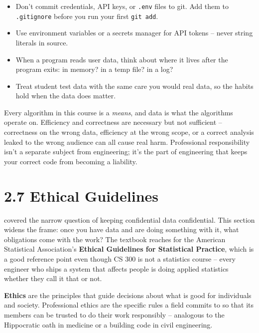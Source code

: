 \documentclass[11pt]{article}
\begin{document}
\begin{itemize}[leftmargin=*,noitemsep]
    \item Don't commit credentials, API keys, or \texttt{.env} files
          to git. Add them to \texttt{.gitignore} before you run your
          first \texttt{git add}.
    \item Use environment variables or a secrets manager for
          API tokens -- never string literals in source.
    \item When a program reads user data, think about where it lives
          after the program exits: in memory? in a temp file? in a
          log?
    \item Treat student test data with the same care you would real
          data, so the habits hold when the data does matter.
\end{itemize}

\begin{ideabox}
Every algorithm in this course is a \emph{means}, and data is what
the algorithms operate on. Efficiency and correctness are necessary
but not sufficient -- correctness on the wrong data, efficiency at
the wrong scope, or a correct analysis leaked to the wrong audience
can all cause real harm. Professional responsibility isn't a separate
subject from engineering; it's the part of engineering that keeps
your correct code from becoming a liability.
\end{ideabox}

\section{2.7 Ethical Guidelines}

 covered the narrow question of keeping confidential
data confidential. This section widens the frame: once you have data
and are doing something with it, what obligations come with the work?
The textbook reaches for the American Statistical Association's
\textbf{Ethical Guidelines for Statistical Practice}, which is a good
reference point even though CS 300 is not a statistics course --
every engineer who ships a system that affects people is doing applied
statistics whether they call it that or not.

\begin{defnbox}
\textbf{Ethics} are the principles that guide decisions about what is
good for individuals and society. Professional ethics are the
specific rules a field commits to so that its members can be trusted
to do their work responsibly -- analogous to the Hippocratic oath in
medicine or a building code in civil engineering.
\end{defnbox}
\end{document}
